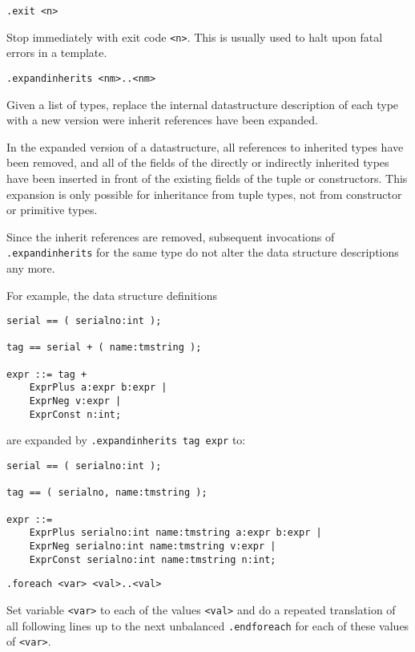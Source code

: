 \begin{verbatim}
.exit <n>
\end{verbatim}
\begin{desc}
Stop {\Tm} immediately with exit code {\tt <n>}.
This is usually used to halt upon fatal errors in a template.
\end{desc}
\begin{verbatim}
.expandinherits <nm>..<nm>
\end{verbatim}
\begin{desc}
\label{s.expandinherits}
Given a list of types, replace the internal datastructure description of
each type with a new version were inherit references have been expanded.
\par
In the expanded version of a datastructure, all references to
inherited types have been removed, and all of the fields of the
directly or indirectly inherited types have been inserted in front of
the existing fields of the tuple or constructors.
This expansion is only possible for inheritance from tuple types, not
from constructor or primitive types.
\par
Since the inherit references are removed,
subsequent invocations of \verb'.expandinherits' for the same
type do not alter the data structure descriptions any more.
\par
For example, the data structure definitions
\begin{verbatim}
serial == ( serialno:int );

tag == serial + ( name:tmstring );

expr ::= tag +
    ExprPlus a:expr b:expr |
    ExprNeg v:expr |
    ExprConst n:int;
\end{verbatim}
are expanded by \verb'.expandinherits tag expr' to:
\begin{verbatim}
serial == ( serialno:int );

tag == ( serialno, name:tmstring );

expr ::=
    ExprPlus serialno:int name:tmstring a:expr b:expr |
    ExprNeg serialno:int name:tmstring v:expr |
    ExprConst serialno:int name:tmstring n:int;
\end{verbatim}
\end{desc}
\begin{verbatim}
.foreach <var> <val>..<val>
\end{verbatim}
\begin{desc}
Set variable {\tt <var>} to each of the values {\tt <val>} and do a
repeated translation of all following lines up to the next unbalanced
{\tt .endforeach}
for each of these values of {\tt <var>}.
\end{desc}
